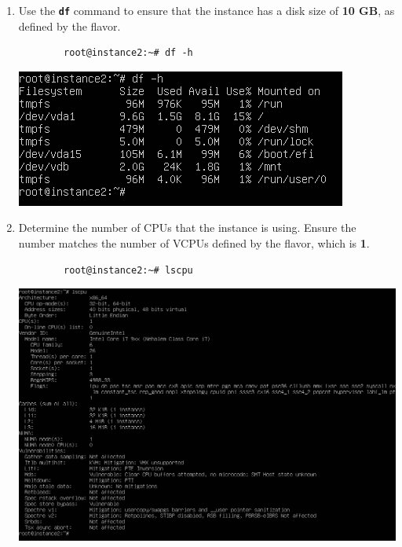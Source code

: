 \documentclass[letterpaper, 12pt]{article}
\begin{document}
\begin{enumerate}
    \item Use the \textbf{\texttt{df}} command to ensure that the instance has a disk size of \textbf{10 GB}, as defined
    by the flavor.
    \begin{lstlisting}
        root@instance2:~# df -h
    \end{lstlisting}

    \begin{center}
        \includegraphics[width=\linewidth]{images/part5/step8.png}
    \end{center}

    \item Determine the number of CPUs that the instance is using. Ensure the number matches the number of VCPUs defined
    by the flavor, which is \textbf{1}.
    \begin{lstlisting}
        root@instance2:~# lscpu
    \end{lstlisting}

    \begin{center}
        \includegraphics[width=\linewidth]{images/part5/step9.png}
    \end{center}


\end{enumerate}
\end{document}
